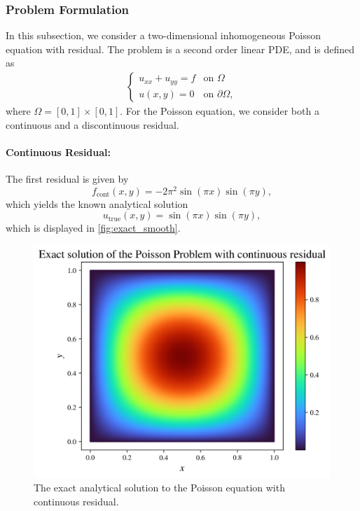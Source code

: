\subsubsection{Problem Formulation}
In this subsection, we consider a two-dimensional inhomogeneous Poisson equation with residual.
The problem is a second order linear PDE, and is defined as
\begin{align}\label{eq:poisson}
\begin{cases}
    u_{xx}+u_{yy} = f &\text{on } \Omega \\
    u(x,y) = 0 &\text{on } \partial\Omega,
\end{cases}
\end{align}
where $\Omega = [0,1] \times [0,1]$.
For the Poisson equation, we consider both a continuous and a discontinuous residual.

\paragraph{Continuous Residual:}
The first residual is given by
\begin{equation}\label{eq:continuous_poisson}
    f_{\text{cont}}(x,y)= -2\pi^2\sin(\pi x) \sin(\pi y),
\end{equation}
which yields the known analytical solution
\begin{equation*}
    u_{\text{true}}(x,y)=\sin(\pi x) \sin(\pi y),
\end{equation*}
which is displayed in \autoref{fig:exact_smooth}.

\begin{figure}[h]
    \centering
    \includegraphics[width=0.8\linewidth]{Project1XPINNs/figures/Poisson/smooth_Poisson_true.png}
    \caption{The exact analytical solution to the Poisson equation with continuous residual.}
    \label{fig:exact_smooth}
\end{figure}

